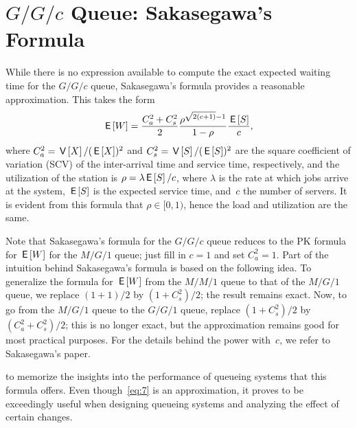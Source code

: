 \documentclass[queueing-book.tex]{subfiles}
\begin{document}
\section{\texorpdfstring{$G/G/c$}{GGC} Queue: Sakasegawa's Formula}\label{sec:gg1}


While there is no expression available to compute the exact expected waiting time for the $G/G/c$ queue, Sakasegawa's formula provides a reasonable approximation.
This takes the form
\begin{equation}\label{eq:7}
 \,\mathsf{E}\left[W\right] = \frac{C_a^2+C_s^2}2 \frac{\rho^{\sqrt{2(c+1)}-1}}{1-\rho} \frac{\,\mathsf{E}\left[S\right]}{c},
\end{equation}
where $C_a^2 = \,\mathsf{V}\left[X\right]/(\,\mathsf{E}\left[X\right] )^2$ and $C_s^2=\,\mathsf{V}\left[S\right]/(\,\mathsf{E}\left[S\right])^2$ are the square coefficient of variation (SCV) of the inter-arrival time and service time, respectively, and the utilization of the station
is $\rho = \lambda \,\mathsf{E}\left[S\right]/c$, where $\lambda$ is the rate at which jobs arrive at the system, $\,\mathsf{E}\left[S\right]$ is the expected service time, and~$c$ the number of servers. It is evident from this formula that $\rho \in[0, 1)$, hence the load and utilization are the same.


Note that Sakasegawa's formula for the $G/G/c$ queue reduces to the PK formula for $\,\mathsf{E}\left[W\right]$ for the $M/G/1$ queue; just fill in $c=1$ and set $C_a^2=1$.
Part of the intuition behind Sakasegawa's formula is based on the following idea.
To generalize the formula for $\,\mathsf{E}\left[W\right]$ from the $M/M/1$ queue to that of the $M/G/1$ queue, we replace $(1+1)/2$ by $(1+C_{s}^{2})/2$; the result remains exact.
Now, to go from the $M/G/1$ queue to the $G/G/1$ queue, replace $(1+C_{s}^{2})/2$ by $(C_a^2+C_s^2)/2$; this is no longer exact, but the approximation remains good for most practical purposes. For the details behind the power with~$c$, we refer to Sakasegawa's paper.


 to memorize the insights into the performance of queueing systems that this formula offers.
Even though~\cref{eq:7} is an approximation, it proves to be exceedingly useful when designing queueing systems and analyzing the effect of certain changes.
\end{document}
